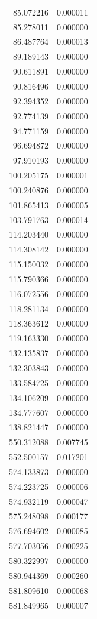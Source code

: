 \begin{longtable}{rr}
85.072216 & 0.000011 \\
85.278011 & 0.000000 \\
86.487764 & 0.000013 \\
89.189143 & 0.000000 \\
90.611891 & 0.000000 \\
90.816496 & 0.000000 \\
92.394352 & 0.000000 \\
92.774139 & 0.000000 \\
94.771159 & 0.000000 \\
96.694872 & 0.000000 \\
97.910193 & 0.000000 \\
100.205175 & 0.000001 \\
100.240876 & 0.000000 \\
101.865413 & 0.000005 \\
103.791763 & 0.000014 \\
114.203440 & 0.000000 \\
114.308142 & 0.000000 \\
115.150032 & 0.000000 \\
115.790366 & 0.000000 \\
116.072556 & 0.000000 \\
118.281134 & 0.000000 \\
118.363612 & 0.000000 \\
119.163330 & 0.000000 \\
132.135837 & 0.000000 \\
132.303843 & 0.000000 \\
133.584725 & 0.000000 \\
134.106209 & 0.000000 \\
134.777607 & 0.000000 \\
138.821447 & 0.000000 \\
550.312088 & 0.007745 \\
552.500157 & 0.017201 \\
574.133873 & 0.000000 \\
574.223725 & 0.000006 \\
574.932119 & 0.000047 \\
575.248098 & 0.000177 \\
576.694602 & 0.000085 \\
577.703056 & 0.000225 \\
580.322997 & 0.000000 \\
580.944369 & 0.000260 \\
581.809610 & 0.000068 \\
581.849965 & 0.000007 \\

\end{longtable}
